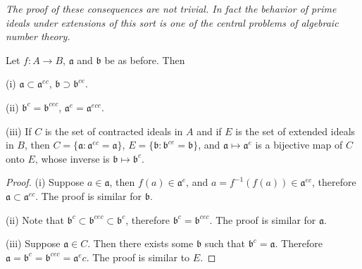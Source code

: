 \begin{note}\em
The proof of these consequences are not trivial. In fact the behavior of prime ideals under extensions of this sort is one of the central problems of algebraic number theory.
\end{note}
\begin{proposition}
Let $f:A\to B$, $\mathfrak{a}$ and $\mathfrak{b}$ be as before. Then \par
(i) $\mathfrak{a}\subset\mathfrak{a}^{ec}$, $\mathfrak{b}\supset\mathfrak{b}^{ce}$.\par
(ii) $\mathfrak{b}^c=\mathfrak{b}^{cec}$, $\mathfrak{a}^e=\mathfrak{a}^{ece}$.\par
(iii) If $C$ is the set of contracted ideals in $A$ and if $E$ is the set of extended ideals in $B$, then $C=\{\mathfrak{a}:\mathfrak{a}^{ec}=\mathfrak{a}\}$, $E=\{\mathfrak{b}:\mathfrak{b}^{ce}=\mathfrak{b}\}$, and $\mathfrak{a}\mapsto\mathfrak{a}^e$ is a bijective map of $C$ onto $E$, whose inverse is $\mathfrak{b}\mapsto\mathfrak{b}^c$.
\end{proposition}
\begin{proof}
(i) Suppose $a\in\mathfrak{a}$, then $f(a)\in\mathfrak{a}^e$, and $a=f^{-1}(f(a))\in\mathfrak{a}^{ec}$, therefore $\mathfrak{a}\subset\mathfrak{a}^{ec}$. The proof is similar for $\mathfrak{b}$.\par
(ii) Note that $\mathfrak{b}^c\subset\mathfrak{b}^{cec}\subset\mathfrak{b}^c$, therefore $\mathfrak{b}^c=\mathfrak{b}^{cec}$. The proof is similar for $\mathfrak{a}$.\par
(iii) Suppose $\mathfrak{a}\in C$. Then there exists some $\mathfrak{b}$ such that $\mathfrak{b}^c=\mathfrak{a}$. Therefore $\mathfrak{a}=\mathfrak{b}^c=\mathfrak{b}^{cec}=\mathfrak{a}^ec$. The proof is similar to $E$.
\end{proof}
